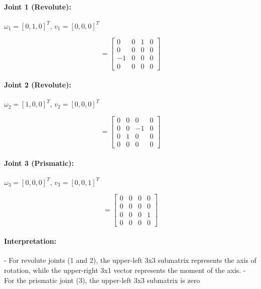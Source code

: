 \begin{solution}
\paragraph{Joint 1 (Revolute):}
$\omega_1 = [0, 1, 0]^T$, $v_1 = [0, 0, 0]^T$

\begin{equation}
[S_1] = \begin{bmatrix}
0 & 0 & 1 & 0 \\
0 & 0 & 0 & 0 \\
-1 & 0 & 0 & 0 \\
0 & 0 & 0 & 0
\end{bmatrix}
\end{equation}

\paragraph{Joint 2 (Revolute):}
$\omega_2 = [1, 0, 0]^T$, $v_2 = [0, 0, 0]^T$

\begin{equation}
[S_2] = \begin{bmatrix}
0 & 0 & 0 & 0 \\
0 & 0 & -1 & 0 \\
0 & 1 & 0 & 0 \\
0 & 0 & 0 & 0
\end{bmatrix}
\end{equation}

\paragraph{Joint 3 (Prismatic):}
$\omega_3 = [0, 0, 0]^T$, $v_3 = [0, 0, 1]^T$

\begin{equation}
[S_3] = \begin{bmatrix}
0 & 0 & 0 & 0 \\
0 & 0 & 0 & 0 \\
0 & 0 & 0 & 1\\
0 & 0 & 0 & 0
\end{bmatrix}
\end{equation}

\paragraph{Interpretation:}
- For revolute joints (1 and 2), the upper-left 3x3 submatrix represents the axis of rotation, while the upper-right 3x1 vector represents the moment of the axis.
- For the prismatic joint (3), the upper-left 3x3 submatrix is zero


\end{solution}

